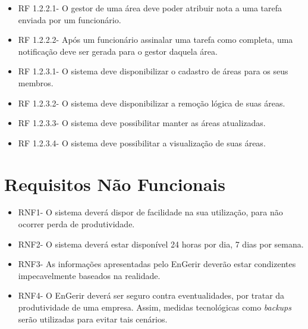 \begin{itemize}
\item RF 1.2.2.1- O gestor de uma área deve poder atribuir nota a uma tarefa enviada por um funcionário.
\item RF 1.2.2.2- Após um funcionário assinalar uma tarefa como completa, uma notificação deve ser gerada para o gestor daquela área.
\item RF 1.2.3.1- O sistema deve disponibilizar o cadastro de áreas para os seus membros.
\item RF 1.2.3.2- O sistema deve disponibilizar a remoção lógica de suas áreas.
\item RF 1.2.3.3- O sistema deve possibilitar manter as áreas atualizadas.
\item RF 1.2.3.4- O sistema deve possibilitar a visualização de suas áreas.
\end{itemize}

\section{Requisitos Não Funcionais}
\begin{itemize}
\item RNF1- O sistema deverá dispor de facilidade na sua utilização, para não ocorrer perda de produtividade.
\item RNF2- O sistema deverá estar disponível 24 horas por dia, 7 dias por semana.
\item RNF3- As informações apresentadas pelo EnGerir deverão estar condizentes impecavelmente baseados na realidade.
\item RNF4- O EnGerir deverá ser seguro contra eventualidades, por tratar da produtividade de uma empresa. Assim, medidas tecnológicas como \textit{backups} serão utilizadas para evitar tais cenários.
\end{itemize}

